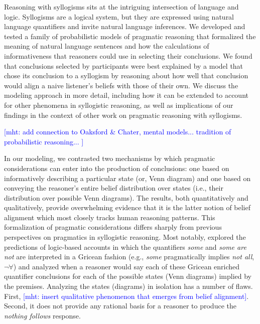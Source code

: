 \documentclass[floatsintext, doc]{apa6}
\newcommand{\mht}[1]{{\textcolor{Blue}{[mht: #1]}}}
\begin{document}
Reasoning with syllogisms sits at the intriguing intersection of language and logic. 
Syllogisms are a logical system, but they are expressed using natural language quantifiers and invite natural language inferences. 
We developed and tested a family of probabilistic models of pragmatic reasoning that formalized the meaning of natural language sentences and how the calculations of informativeness that reasoners could use in selecting their conclusions.
We found that conclusions selected by participants were best explained by a model that chose its conclusion to a syllogism by reasoning about how well that conclusion would align a naive listener's beliefs with those of their own. 
We discuss the modeling approach in more detail, including how it can be extended to account for other phenomena in syllogistic reasoning, as well as implications of our findings in the context of other work on pragmatic reasoning with syllogisms.

\mht{add connection to Oaksford \& Chater, mental models... tradition of probabilistic reasoning... }


In our modeling, we contrasted two mechanisms by which pragmatic considerations can enter into the production of conclusions: one based on informatively describing a particular state (or, Venn diagram) and one based on conveying the reasoner's entire belief distribution over states (i.e., their distribution over possible Venn diagrams). 
The results, both quantitatively and qualitatively, provide overwhelming evidence that it is the latter notion of belief alignment which most closely tracks human reasoning patterns. 
This formalization of pragmatic considerations differs sharply from previous perspectives on pragmatics in syllogistic reasoning.
Most notably,  explored the predictions of logic-based accounts in which the quantifiers \emph{some} and \emph{some are not} are interpreted in a Gricean fashion (e.g., \emph{some} pragmatically implies \emph{not all}, $\neg \forall$) and analyzed when a reasoner would say each of these Gricean enriched quantifier conclusions for each of the possible states (Venn diagrams) implied by the premises. 
Analyzing the states (diagrams) in isolation has a number of flaws.
First, \mht{insert qualitative phenomenon that emerges from belief alignment}.
Second, it does not provide any rational basis for a reasoner to produce the \emph{nothing follows} response.
\end{document}
